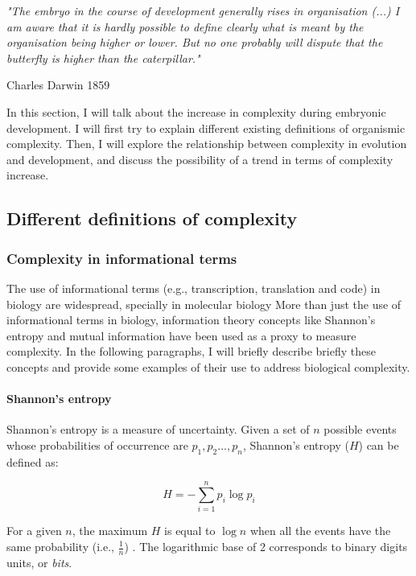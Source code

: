 \setlength{\epigraphrule}{0\p@}
\setlength{\epigraphwidth}{.7\textwidth}
\epigraph{\textit{"The embryo in the course of development generally rises in organisation (...) I am aware that it is hardly possible to define clearly what is meant by the organisation being higher or lower. But no one probably will dispute that the butterfly is higher than the caterpillar."}}{Charles Darwin 1859}

In this section, I will talk about the increase in complexity during embryonic development.
I will first try to explain different existing definitions of organismic complexity.
Then, I will explore the relationship between complexity in evolution and development, and discuss the possibility of a trend in terms of complexity increase.


\subsection{Different definitions of complexity}


\subsubsection{Complexity in informational terms}

The use of informational terms (e.g., transcription, translation and code) in biology are widespread, specially in molecular biology \citep{Smith2000,yockey2005information}
More than just the use of informational terms in biology, information theory concepts like Shannon's entropy and mutual information have been used as a proxy to measure complexity.
In the following paragraphs, I will briefly describe briefly these concepts and provide some examples of their use to address biological complexity.

\paragraph{Shannon's entropy}

Shannon's entropy is a measure of uncertainty. Given a set of $n$ possible events whose probabilities of occurrence are $p_{1}, p_{2}...,p_{n}$, Shannon's entropy ($H$) can be defined as:

$$H = -\sum_{i=1}^{n} p_{i} \log p_{i}$$

For a given $n$, the maximum $H$ is equal to $\log n$ when all the events have the same probability (i.e., $\frac{1}{n}$) \citep{Shannon1948}. The logarithmic base of 2 corresponds to binary digits units, or \textit{bits}.

